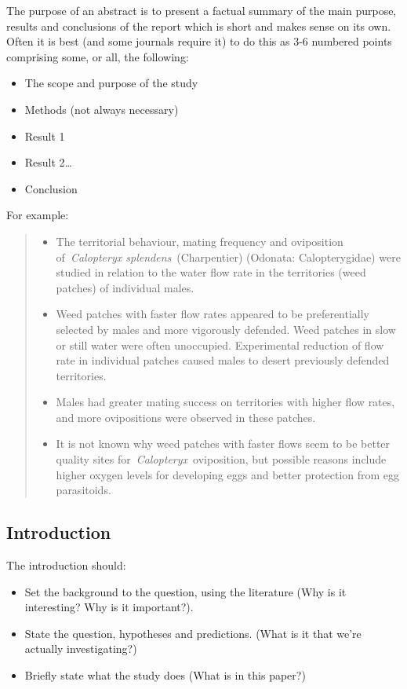 \documentclass[
]{book}
\providecommand{\tightlist}{%
  \setlength{\itemsep}{0pt}\setlength{\parskip}{0pt}}
\begin{document}
The purpose of an abstract is to present a factual summary of the main purpose, results and conclusions of the report which is short and makes sense on its own. Often it is best (and some journals require it) to do this as 3-6 numbered points comprising some, or all, the following:

\begin{itemize}
\tightlist
\item
  The scope and purpose of the study
\item
  Methods (not always necessary)
\item
  Result 1
\item
  Result 2\ldots{}
\item
  Conclusion
\end{itemize}

For example:

\begin{quote}
\begin{itemize}
\tightlist
\item
  The territorial behaviour, mating frequency and oviposition of~\emph{Calopteryx splendens}~(Charpentier) (Odonata: Calopterygidae) were studied in relation to the water flow rate in the territories (weed patches) of individual males.
\item
  Weed patches with faster flow rates appeared to be preferentially selected by males and more vigorously defended. Weed patches in slow or still water were often unoccupied. Experimental reduction of flow rate in individual patches caused males to desert previously defended territories.
\item
  Males had greater mating success on territories with higher flow rates, and more ovipositions were observed in these patches.
\item
  It is not known why weed patches with faster flows seem to be better quality sites for~\emph{Calopteryx}~oviposition, but possible reasons include higher oxygen levels for developing eggs and better protection from egg parasitoids.
\end{itemize}
\end{quote}

\hypertarget{introduction-6}{%
\subsection{Introduction}\label{introduction-6}}

The introduction should:

\begin{itemize}
\tightlist
\item
  Set the background to the question, using the literature (Why is it interesting? Why is it important?).
\item
  State the question, hypotheses and predictions. (What is it that we're actually investigating?)
\item
  Briefly state what the study does (What is in this paper?)
\end{itemize}
\end{document}
